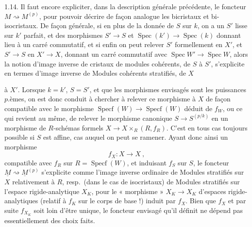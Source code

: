\documentclass[11pt,a4paper]{article}
\begin{document}
1.14. Il faut encore expliciter, dans la description générale précédente, le
 foncteur $M\rightsquigarrow M^{(p)}$, pour pouvoir décrire de
façon analogue les bicristaux et bi-isocristaux. De façon générale, si en plus
de la donnée de $S$ sur $k$, on a un $S'$ lisse sur $k'$ parfait, et des
morphismes $S'\to S$ et $\operatorname{Spec}(k')\to\operatorname{Spec}(k)$
donnant lieu à un carré commutatif, et si enfin on peut relever $S'$
formellement en $X'$, et $S'\to S$ en $X'\to X$, donnant un carré commutatif
avec $\operatorname{Spec}W'\to\operatorname{Spec}W$, alors la notion d'image
inverse de cristaux de modules cohérents, de $S$ à $S'$, s'explicite en termes
d'image inverse de Modules cohérents stratifiés, de $X$

à $X'$. Lorsque $k=k'$, $S=S'$, et que les morphismes envisagés sont les
puissances $p$.èmes, on est donc conduit à chercher à 
relever ce morphisme à $X$ de façon compatible avec le morphisme
$\operatorname{Specf}(W)\to\operatorname{Specf}(W)$ déduit de $f_W$, ou ce qui
revient au même, de relever le morphisme canonique $S\to S^{(p/k)}$ en un
morphisme de $R$-schémas formels $X\to X\times_R(R,f_R)$. C'est en tous cas toujours
possible si $S$ est affine, cas auquel on peut se ramener. Ayant donc ainsi un
morphisme
\[
  f_X\colon X\longrightarrow X\ ,
\]
compatible avec $f_R$ sur $R=\operatorname{Specf}(W)$, et induisant $f_S$ sur
$S$, le foncteur $\underline{M}\rightsquigarrow\underline{M}^{(p)}$ s'explicite
comme l'image inverse ordinaire de Modules stratifiés sur $X$ relativement à
$R$, resp.\ (dans le cas de isocristaux) de Modules stratifiés sur l'espace
rigide-analytique $X_K$, pour le « morphisme » $X_K\to X_K$ d'espaces
rigide-analytiques (relatif à $f_K$ sur le corps de base !) induit par $f_X$.
Bien que $f_X$ et par suite $f_{X_K}$ soit loin d'être unique, le foncteur
envisagé qu'il définit ne dépend pas\add{,} essentiellement\add{,} des choix
faits.
\end{document}
